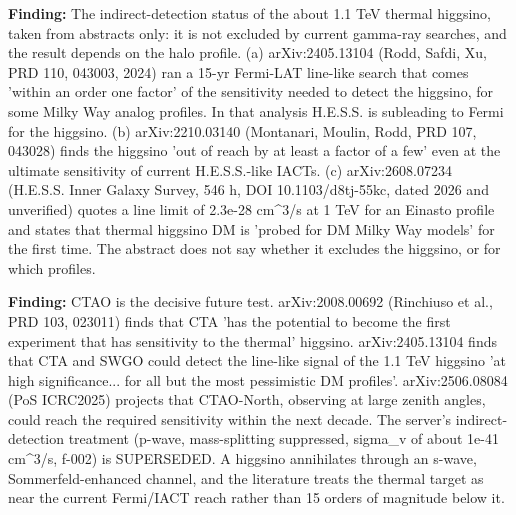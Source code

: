 \documentclass[11pt,a4paper]{article}
\begin{document}
\textbf{Finding:} The indirect-detection status of the about 1.1 TeV thermal higgsino, taken from abstracts only: it is not excluded by current gamma-ray searches, and the result depends on the halo profile. (a) arXiv:2405.13104 (Rodd, Safdi, Xu, PRD 110, 043003, 2024) ran a 15-yr Fermi-LAT line-like search that comes 'within an order one factor' of the sensitivity needed to detect the higgsino, for some Milky Way analog profiles. In that analysis H.E.S.S. is subleading to Fermi for the higgsino. (b) arXiv:2210.03140 (Montanari, Moulin, Rodd, PRD 107, 043028) finds the higgsino 'out of reach by at least a factor of a few' even at the ultimate sensitivity of current H.E.S.S.-like IACTs. (c) arXiv:2608.07234 (H.E.S.S. Inner Galaxy Survey, 546 h, DOI 10.1103/d8tj-55kc, dated 2026 and unverified) quotes a line limit of 2.3e-28 cm\textasciicircum{}3/s at 1 TeV for an Einasto profile and states that thermal higgsino DM is 'probed for DM Milky Way models' for the first time. The abstract does not say whether it excludes the higgsino, or for which profiles.

\textbf{Finding:} CTAO is the decisive future test. arXiv:2008.00692 (Rinchiuso et al., PRD 103, 023011) finds that CTA 'has the potential to become the first experiment that has sensitivity to the thermal' higgsino. arXiv:2405.13104 finds that CTA and SWGO could detect the line-like signal of the 1.1 TeV higgsino 'at high significance... for all but the most pessimistic DM profiles'. arXiv:2506.08084 (PoS ICRC2025) projects that CTAO-North, observing at large zenith angles, could reach the required sensitivity within the next decade. The server's indirect-detection treatment (p-wave, mass-splitting suppressed, sigma\_v of about 1e-41 cm\textasciicircum{}3/s, f-002) is SUPERSEDED. A higgsino annihilates through an s-wave, Sommerfeld-enhanced channel, and the literature treats the thermal target as near the current Fermi/IACT reach rather than 15 orders of magnitude below it.
\end{document}
